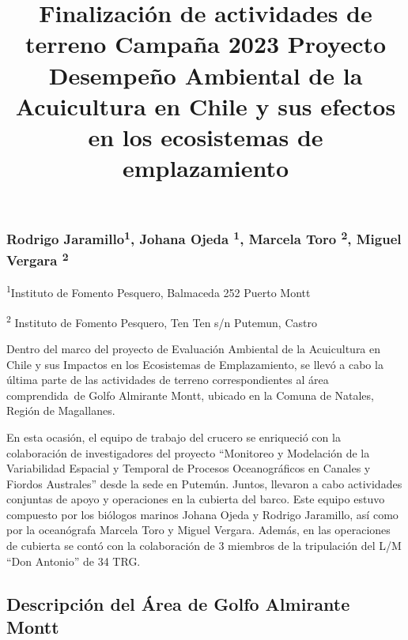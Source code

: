 \documentclass[
  letterpaper,
  DIV=11,
  numbers=noendperiod]{scrartcl}
\title{Finalización de actividades de terreno Campaña 2023 Proyecto
Desempeño Ambiental de la Acuicultura en Chile y sus efectos en los
ecosistemas de emplazamiento}
\author{}
\date{}
\begin{document}
\maketitle
\ifdefined\Shaded\renewenvironment{Shaded}{\begin{tcolorbox}[boxrule=0pt, interior hidden, frame hidden, breakable, borderline west={3pt}{0pt}{shadecolor}, enhanced, sharp corners]}{\end{tcolorbox}}\fi

\hypertarget{rodrigo-jaramillo1-johana-ojeda-1-marcela-toro-2-miguel-vergara-2}{%
\subsubsection{\texorpdfstring{Rodrigo Jaramillo\textsuperscript{1},
Johana Ojeda \textsuperscript{1}, Marcela Toro \textsuperscript{2},
Miguel Vergara
\textsuperscript{2}}{Rodrigo Jaramillo1, Johana Ojeda 1, Marcela Toro 2, Miguel Vergara 2}}\label{rodrigo-jaramillo1-johana-ojeda-1-marcela-toro-2-miguel-vergara-2}}

\textsuperscript{1}Instituto de Fomento Pesquero, Balmaceda 252 Puerto
Montt

\textsuperscript{2} Instituto de Fomento Pesquero, Ten Ten s/n Putemun,
Castro

Dentro del marco del proyecto de Evaluación Ambiental de la Acuicultura
en Chile y sus Impactos en los Ecosistemas de Emplazamiento, se llevó a
cabo la última parte de las actividades de terreno correspondientes al
área comprendida~de Golfo Almirante Montt, ubicado en la Comuna de
Natales, Región de Magallanes.~

En esta ocasión, el equipo de trabajo del crucero se enriqueció con la
colaboración de investigadores del proyecto ``Monitoreo y Modelación de
la Variabilidad Espacial y Temporal de Procesos Oceanográficos en
Canales y Fiordos Australes'' desde la sede en Putemún. Juntos, llevaron
a cabo actividades conjuntas de apoyo y operaciones en la cubierta del
barco. Este equipo estuvo compuesto por los biólogos marinos Johana
Ojeda y Rodrigo Jaramillo, así como por la oceanógrafa Marcela Toro y
Miguel Vergara. Además, en las operaciones de cubierta se contó con la
colaboración de 3 miembros de la tripulación del L/M ``Don Antonio'' de
34 TRG.

\hypertarget{descripciuxf3n-del-uxe1rea-de-golfo-almirante-montt}{%
\subsection{Descripción del Área de Golfo Almirante
Montt}\label{descripciuxf3n-del-uxe1rea-de-golfo-almirante-montt}}
\end{document}
